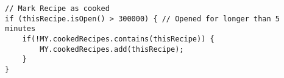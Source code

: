 \listoffigures
\newpage
	
\listoftables
\newpage

\lstlistoflistings
\newpage
\begin{lstlisting}[caption=Pseudocode - Ähnliche Rezepte,label={lst:SimilarRecipes}]
// Mark Recipe as cooked
if (thisRecipe.isOpen() > 300000) { // Opened for longer than 5 minutes
    if(!MY.cookedRecipes.contains(thisRecipe)) { 
        MY.cookedRecipes.add(thisRecipe);
    }
}
\end{lstlisting}
\newpage

\renewcommand\refname{Literaturverzeichnis}



\newpage
